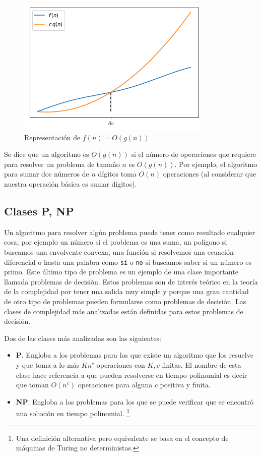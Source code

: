 \begin{figure}[H]
    \centering
    \includegraphics[scale=.8]{Imagenes/bigo.png}
    \caption{Representación de $f(n)= O(g(n))$}
    \label{fig:bigo}
\end{figure}

Se dice que un algoritmo es $O(g(n))$ si el número de operaciones que requiere para resolver un problema de tamaño $n$ es $O(g(n))$.
%
Por ejemplo, el algoritmo para sumar dos números de $n$ dígitos toma $O(n)$ operaciones (al considerar que nuestra operación básica es sumar dígitos).

\subsection*{Clases \textbf{P}, \textbf{NP} }
Un algoritmo para resolver algún problema puede tener como resultado cualquier cosa; por ejemplo un número si el problema es una suma, un polígono si buscamos una envolvente convexa, una función si resolvemos una ecuación diferencial o hasta una palabra como \texttt{sí} o \texttt{no} si buscamos saber si un número es primo.
%
Este último tipo de problema es un ejemplo de una clase importante llamada problemas de decisión. Estos problemas son de interés teórico en la teoría de la complejidad por tener una salida muy simple y porque una gran cantidad de otro tipo de problemas pueden formularse como problemas de decisión. 
%
Las clases de complejidad más analizadas están definidas para estos problemas de decisión.

Dos de las clases más analizadas son las siguientes:

\begin{itemize} 
    \item \textbf{P}. Engloba a los problemas para los que existe un algoritmo que los resuelve y que toma a lo más $Kn^c$ operaciones con $K,c$ finitas. 
		El nombre de esta clase hace referencia a que pueden resolverse en tiempo polinomial es decir que toman $O(n^c)$ operaciones para alguna $c$ positiva y finita. 

    \item \textbf{NP}. Engloba a los problemas para los que se puede verificar que se encontró una solución en tiempo polinomial. \footnote{Una definición alternativa pero equivalente se basa en el concepto de máquinas de Turing no deterministas.}
\end{itemize}

